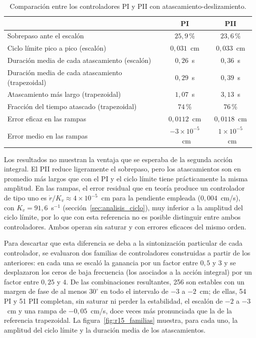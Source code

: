 \begin{table}[ht]
\centering
\caption{Comparación entre los controladores PI y PII con atascamiento-deslizamiento.}
\label{tab:pi_pii}
\begin{tabular}{|l|c|c|}
\hline
 & PI & PII \\ \hline
Sobrepaso ante el escalón & $25{,}9$\,\% & $23{,}6$\,\% \\ \hline
Ciclo límite pico a pico (escalón) & $0{,}031$~cm & $0{,}033$~cm \\ \hline
Duración media de cada atascamiento (escalón) & $0{,}26$~s & $0{,}36$~s \\ \hline
Duración media de cada atascamiento (trapezoidal) & $0{,}29$~s & $0{,}39$~s \\ \hline
Atascamiento más largo (trapezoidal) & $1{,}07$~s & $3{,}13$~s \\ \hline
Fracción del tiempo atascado (trapezoidal) & $74$\,\% & $76$\,\% \\ \hline
Error eficaz en las rampas & $0{,}0112$~cm & $0{,}0118$~cm \\ \hline
Error medio en las rampas & $-3\times10^{-5}$~cm & $1\times10^{-5}$~cm \\ \hline
\end{tabular}
\end{table}

Los resultados no muestran la ventaja que se esperaba de la segunda acción integral. El PII reduce ligeramente el sobrepaso, pero los atascamientos son en promedio más largos que con el PI y el ciclo límite tiene prácticamente la misma amplitud. En las rampas, el error residual que en teoría produce un controlador de tipo uno es $\dot r/K_v \approx 4\times10^{-5}$~cm para la pendiente empleada ($0{,}004$~cm/s), con $K_v=91{,}6$~s$^{-1}$ (sección~\ref{sec:analisis_ciclo}), muy inferior a la amplitud del ciclo límite, por lo que con esta referencia no es posible distinguir entre ambos controladores. Ambos operan sin saturar y con errores eficaces del mismo orden.

Para descartar que esta diferencia se deba a la sintonización particular de cada controlador, se evaluaron dos familias de controladores construidas a partir de los anteriores: en cada una se escaló la ganancia por un factor entre $0{,}5$ y $3$ y se desplazaron los ceros de baja frecuencia (los asociados a la acción integral) por un factor entre $0{,}25$ y $4$. De las combinaciones resultantes, 256 son estables con un margen de fase de al menos $30^\circ$ en todo el intervalo de $-3$ a $-2$~cm; de ellas, 54 PI y 51 PII completan, sin saturar ni perder la estabilidad, el escalón de $-2$ a $-3$~cm y una rampa de $-0{,}05$~cm/s, doce veces más pronunciada que la de la referencia trapezoidal. La figura~\ref{fig:r15_familias} muestra, para cada uno, la amplitud del ciclo límite y la duración media de los atascamientos.

